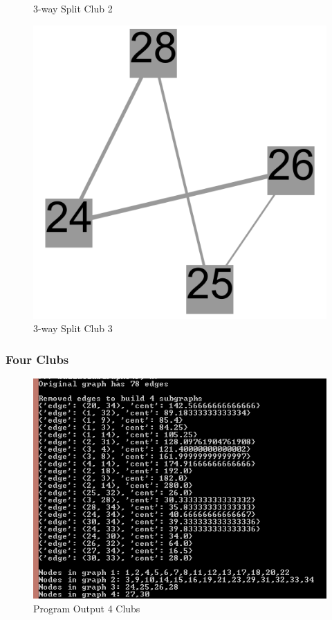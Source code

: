 \documentclass[paper=a4, fontsize=11pt]{scrartcl} %
\numberwithin{equation}{section} %
\numberwithin{figure}{section} %
\numberwithin{table}{section} %
\begin{document}
\begin{figure}[H]
\begin{minipage}{.4\textwidth}
\caption{3-way Split Club 2}
\label{fig:3clubs2}
\end{minipage}%
\begin{minipage}{.25\textwidth}
  \centering
\includegraphics[width=1\textwidth]{3clubs/club3}
\caption{3-way Split Club 3}
\label{fig:3clubs3}
\end{minipage}
\end{figure}

\subsubsection{Four Clubs}
\begin{figure}[H]
\includegraphics[width=1\textwidth]{4clubs/output}
\caption{Program Output 4 Clubs}
\label{fig:output4}
\end{figure}
\end{document}

